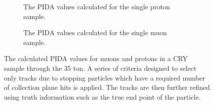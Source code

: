 \begin{figure}[h!]
  \centering
  \begin{subfigure}{.45\textwidth}
        \centering
        \caption{The PIDA values calculated for the single proton sample.}
        \label{fig:CRY_PIDA_Proton}
  \end{subfigure}
  \hspace{0.08\textwidth}
  \begin{subfigure}{.45\textwidth}
        \centering
        \caption{The PIDA values calculated for the single muon sample.}
        \label{fig:CRY_PIDA_Muon}
  \end{subfigure}
  \caption[The calculated PIDA values for muons and protons in a CRY sample through the 35 ton]
          {The calculated PIDA values for muons and protons in a CRY sample through the 35 ton. A series of criteria designed to select only tracks due to stopping particles which have a required number of collection plane hits is applied. The tracks are then further refined using truth information such as the true end point of the particle.}
  \label{fig:CRY_PIDA}
\end{figure}
